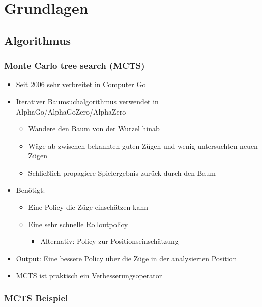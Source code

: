 \section{Grundlagen}




\subsection{Algorithmus}



\begin{frame}
 \frametitle{Monte Carlo tree search (MCTS)}
  


\begin{itemize}
  \item \pause Seit 2006 sehr verbreitet in Computer Go
  \item \pause Iterativer Baumsuchalgorithmus verwendet in AlphaGo/AlphaGoZero/AlphaZero
\begin{itemize}
  \item \pause Wandere den Baum von der Wurzel hinab
  \item \pause Wäge ab zwischen bekannten guten Zügen und wenig untersuchten neuen Zügen
  \item \pause Schließlich propagiere Spielergebnis zurück durch den Baum
\end{itemize}
  \item \pause Benötigt:
\begin{itemize}
  \item \pause Eine Policy die Züge einschätzen kann
  \item \pause Eine sehr schnelle Rolloutpolicy
\begin{itemize}
  \item \pause Alternativ: Policy zur Positionseinschätzung
\end{itemize}
\end{itemize}
  \item \pause Output: Eine bessere Policy über die Züge in der analysierten Position
  \item \pause MCTS ist praktisch ein Verbesserungsoperator
\end{itemize}

  
\end{frame}
\begin{frame}
 \frametitle{MCTS Beispiel}
  




  
\end{frame}

